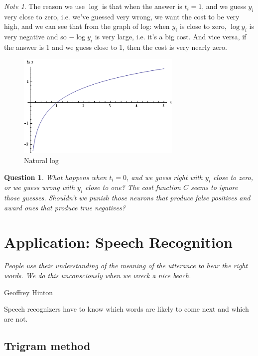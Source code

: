 \documentclass[12pt]{article}
\theoremstyle{plain}
\newtheorem{question}[theorem]{Question}
\theoremstyle{definition}
\theoremstyle{remark}
\newtheorem{note}[theorem]{Note}
\begin{document}
\begin{note}
The reason we use $\log$ is that when the answer is $t_i = 1$, and we guess $y_i$ very close to zero, i.e. we've guessed very wrong, we want the cost to be very high, and we can see that from the graph of log: when $y_i$ is close to zero, $\log y_i$ is very negative and so $- \log y_i$ is very large, i.e. it's a big cost. And vice versa, if the answer is $1$ and we guess close to 1, then the cost is very nearly zero.
\end{note}

\begin{figure}[H]
\centering
\includegraphics[width=0.7\textwidth]{figure_logarithmic_function}
\caption{Natural log}
\end{figure}

\begin{question}
What happens when $t_i = 0$, and we guess right with $y_i$ close to zero, or we guess wrong with $y_i$ close to one? The cost function $C$ seems to ignore those guesses. Shouldn't we punish those neurons that produce false positives and award ones that produce true negatives?
\end{question}

\section{Application: Speech Recognition}

\epigraph{\textit{People use their understanding of the meaning of the utterance to hear the right words. We do this unconsciously when we wreck a nice beach.}}{Geoffrey Hinton}

Speech recognizers have to know which words are likely to come next and which are not. 

\subsection{Trigram method}
\end{document}
